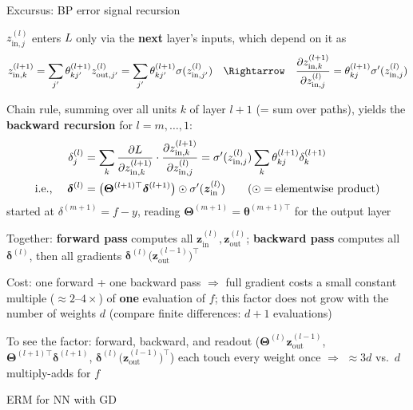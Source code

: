 \documentclass[11pt,compress,t,notes=noshow, xcolor=table]{beamer}
\newcommand{\zin}[2]{z_{\text{in},{#1}}^{(#2)}}
\newcommand{\zout}[2]{z_{\text{out},{#1}}^{(#2)}}
\begin{document}
\begin{framei}[fs=footnotesize]{Excursus: BP error signal recursion}
\item $\zin{j}{l}$ enters $L$ only via the \textbf{next} layer's inputs, which depend on it as
$$\zin{k}{l+1} = \sum_{j'} \theta_{kj'}^{(l+1)} \zout{j'}{l} = \sum_{j'} \theta_{kj'}^{(l+1)} \sigma(\zin{j'}{l})
\quad \Rightarrow \quad \pd{\zin{k}{l+1}}{\zin{j}{l}} = \theta_{kj}^{(l+1)} \sigma'(\zin{j}{l})$$
\item Chain rule, summing over all units $k$ of layer $l+1$ (= sum over paths), yields the \textbf{backward recursion} for $l = m, \dots, 1$:
\begin{align*}
\delta_j^{(l)} &= \sum_k \pd{L}{\zin{k}{l+1}} \cdot \pd{\zin{k}{l+1}}{\zin{j}{l}} = \sigma'(\zin{j}{l}) \sum_k \theta_{kj}^{(l+1)} \delta_k^{(l+1)}\\
\text{i.e., } \quad \bm{\delta}^{(l)} &= \big( \bm{\Theta}^{(l+1) \top} \bm{\delta}^{(l+1)} \big) \odot \sigma'(\bm{z}_{\text{in}}^{(l)}) \qquad (\odot = \text{elementwise product})
\end{align*}
started at $\delta^{(m+1)} = f - y$, reading $\bm{\Theta}^{(m+1)} = \bm{\theta}^{(m+1) \top}$ for the output layer
\item Together: \textbf{forward pass} computes all $\bm{z}_{\text{in}}^{(l)}, \bm{z}_{\text{out}}^{(l)}$; \textbf{backward pass} computes all $\bm{\delta}^{(l)}$, then all gradients $\bm{\delta}^{(l)} \big( \bm{z}_{\text{out}}^{(l-1)} \big)^\top$
\item Cost: one forward + one backward pass $\Rightarrow$ full gradient costs a small constant multiple ($\approx 2$--$4\times$) of \textbf{one} evaluation of $f$; this factor does not grow with the number of weights $d$ (compare finite differences: $d + 1$ evaluations)
\item To see the factor: forward, backward, and readout ($\bm{\Theta}^{(l)} \bm{z}_{\text{out}}^{(l-1)}$, $\bm{\Theta}^{(l+1) \top} \bm{\delta}^{(l+1)}$, $\bm{\delta}^{(l)} \big( \bm{z}_{\text{out}}^{(l-1)} \big)^\top$) each touch every weight once $\Rightarrow$ $\approx 3d$ vs.\ $d$ multiply-adds for $f$
\end{framei}


\begin{framev}[align=top]{ERM for NN with GD}
\end{framev}

\endlecture
\end{document}
